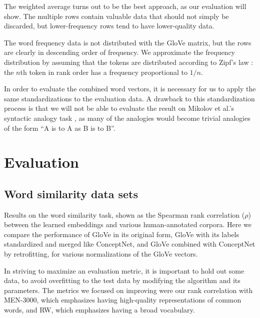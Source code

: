 \documentclass[letterpaper]{article}
\begin{document}
The weighted average turns out to be the best approach, as our evaluation will
show. The multiple rows contain valuable data that should not simply be
discarded, but lower-frequency rows tend to have lower-quality data.

The word frequency data is not distributed with the GloVe matrix, but
the rows are clearly in descending order of frequency. We approximate the
frequency distribution by assuming that the tokens are distributed according to
Zipf's law \cite{zipf1949human}: the $n$th token in rank order has a frequency
proportional to $1/n$.

In order to evaluate the combined word vectors, it is necessary for us to apply
the same standardizations to the evaluation data. A drawback to this
standardization process is that we will not be able to evaluate the result on
Mikolov et al.'s syntactic analogy task \cite{mikolov2013word2vec}, as many of
the analogies would become trivial analogies of the form
``A is to A as B is to B''.

\section{Evaluation}

\subsection{Word similarity data sets}


\begin{table*}[t]
\centering

\caption{
    Results on the word similarity task, shown as the Spearman rank correlation
    ($\rho$) between the learned embeddings and various human-annotated corpora.
    Here we compare the performance of GloVe in its original form, GloVe with
    its labels standardized and merged like ConceptNet, and GloVe combined with
    ConceptNet by retrofitting, for various normalizations of the GloVe vectors.
}
\label{eval-retro-standardize}
\end{table*}

In striving to maximize an evaluation metric, it is important to hold out some
data, to avoid overfitting to the test data by modifying the algorithm and its
parameters. The metrics we focused on improving were our rank correlation with
MEN-3000, which emphasizes having high-quality representations of common words,
and RW, which emphasizes having a broad vocabulary.
\end{document}
